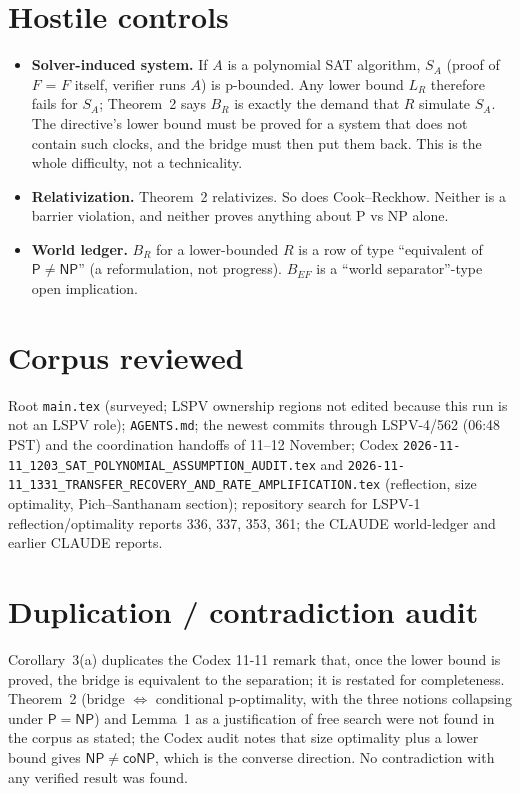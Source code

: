 \documentclass[11pt]{article}
\theoremstyle{remark}
\begin{document}
\section{Hostile controls}
\begin{itemize}
\item \textbf{Solver-induced system.} If $A$ is a polynomial SAT algorithm,
$S_A$ (proof of $F$ = $F$ itself, verifier runs $A$) is p-bounded. Any
lower bound $L_R$ therefore fails for $S_A$; Theorem~2 says $B_R$ is exactly the
demand that $R$ simulate $S_A$. The directive's lower bound must be proved for
a system that does not contain such clocks, and the bridge must then put them
back. This is the whole difficulty, not a technicality.
\item \textbf{Relativization.} Theorem~2 relativizes. So does Cook--Reckhow.
Neither is a barrier violation, and neither proves anything about P vs NP
alone.
\item \textbf{World ledger.} $B_R$ for a lower-bounded $R$ is a row of type
``equivalent of $\mathsf P\neq\mathsf{NP}$'' (a reformulation, not progress).
$B_{EF}$ is a ``world separator''-type open implication.
\end{itemize}

\section{Corpus reviewed}
Root \texttt{main.tex} (surveyed; LSPV ownership regions not edited because
this run is not an LSPV role); \texttt{AGENTS.md}; the newest commits through
LSPV-4/562 (06:48 PST) and the coordination handoffs of 11--12 November;
Codex \texttt{2026-11-11\_1203\_SAT\_POLYNOMIAL\_ASSUMPTION\_AUDIT.tex} and
\texttt{2026-11-11\_1331\_TRANSFER\_RECOVERY\_AND\_RATE\_AMPLIFICATION.tex}
(reflection, size optimality, Pich--Santhanam section); repository search for
LSPV-1 reflection/optimality reports 336, 337, 353, 361; the CLAUDE
world-ledger and earlier CLAUDE reports.

\section{Duplication / contradiction audit}
Corollary~3(a) duplicates the Codex 11-11 remark that, once the lower bound is
proved, the bridge is equivalent to the separation; it is restated for
completeness. Theorem~2 (bridge $\iff$ conditional p-optimality, with the three
notions collapsing under $\mathsf P=\mathsf{NP}$) and Lemma~1 as a justification of
free search were not found in the corpus as stated; the Codex audit notes that
size optimality plus a lower bound gives $\mathsf{NP}\ne\mathsf{coNP}$, which is the
converse direction. No contradiction with any verified result was found.
\end{document}
